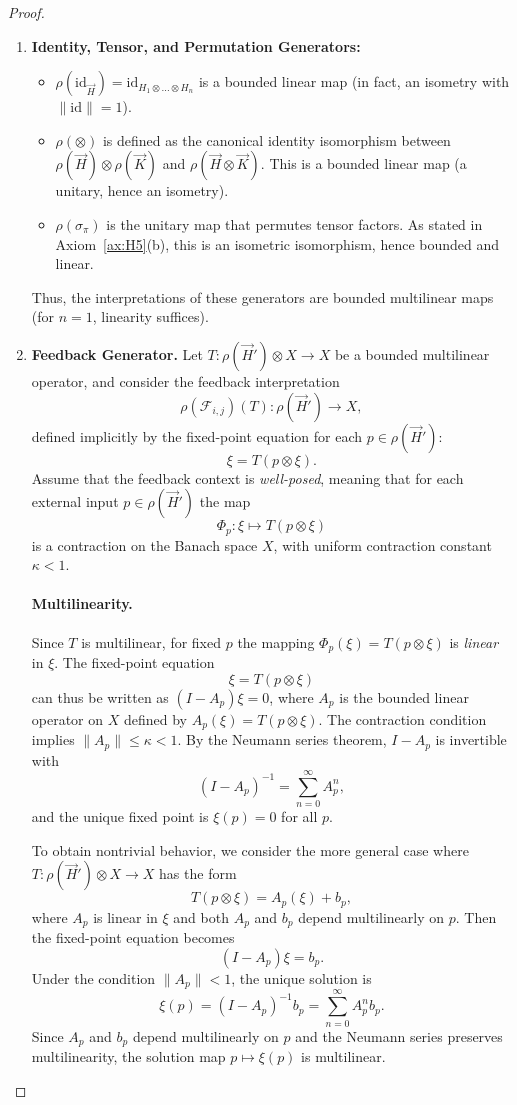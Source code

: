 \documentclass[11pt]{article}
\begin{document}
\begin{proof}
\begin{enumerate}[label=(\alph*)]
    \item \textbf{Identity, Tensor, and Permutation Generators:}
    \begin{itemize}
        \item $\rho(\mathrm{id}_{\vec{H}}) = \mathrm{id}_{H_1 \otimes \dots \otimes H_n}$ is a bounded linear map (in fact, an isometry with $\| \mathrm{id} \| = 1$).
        \item $\rho(\otimes)$ is defined as the canonical identity isomorphism between $\rho(\vec{H}) \otimes \rho(\vec{K})$ and $\rho(\vec{H} \otimes \vec{K})$. This is a bounded linear map (a unitary, hence an isometry).
        \item $\rho(\sigma_{\pi})$ is the unitary map that permutes tensor factors. As stated in Axiom~\ref{ax:H5}(b), this is an isometric isomorphism, hence bounded and linear.
    \end{itemize}
    Thus, the interpretations of these generators are bounded multilinear maps (for $n=1$, linearity suffices).

\item \textbf{Feedback Generator.} 
Let $T: \rho(\vec{H}') \otimes X \to X$ be a bounded multilinear operator, and consider the feedback interpretation 
\[
\rho(\mathcal{F}_{i,j})(T): \rho(\vec{H}') \to X,
\]
defined implicitly by the fixed-point equation for each $p \in \rho(\vec{H}')$:
\[
\xi = T(p \otimes \xi).
\]
Assume that the feedback context is \emph{well-posed}, meaning that for each external input $p \in \rho(\vec{H}')$ the map 
\[
\Phi_p : \xi \mapsto T(p \otimes \xi)
\]
is a contraction on the Banach space $X$, with uniform contraction constant $\kappa < 1$. 

\paragraph{Multilinearity.}
Since $T$ is multilinear, for fixed $p$ the mapping $\Phi_p(\xi) = T(p \otimes \xi)$ is \emph{linear} in $\xi$. The fixed-point equation
\[
\xi = T(p \otimes \xi)
\]
can thus be written as $(I - A_p)\xi = 0$, where $A_p$ is the bounded linear operator on $X$ defined by $A_p(\xi) = T(p \otimes \xi)$. 
The contraction condition implies $\|A_p\| \le \kappa < 1$. By the Neumann series theorem, $I - A_p$ is invertible with
\[
(I - A_p)^{-1} = \sum_{n=0}^\infty A_p^n,
\]
and the unique fixed point is $\xi(p) = 0$ for all $p$. 

To obtain nontrivial behavior, we consider the more general case where $T: \rho(\vec{H}') \otimes X \to X$ has the form
\[
T(p \otimes \xi) = A_p(\xi) + b_p,
\]
where $A_p$ is linear in $\xi$ and both $A_p$ and $b_p$ depend multilinearly on $p$. Then the fixed-point equation becomes
\[
(I - A_p)\xi = b_p.
\]
Under the condition $\|A_p\| < 1$, the unique solution is
\[
\xi(p) = (I - A_p)^{-1} b_p = \sum_{n=0}^\infty A_p^n b_p.
\]
Since $A_p$ and $b_p$ depend multilinearly on $p$ and the Neumann series preserves multilinearity, the solution map $p \mapsto \xi(p)$ is multilinear.


\end{enumerate}
\end{proof}
\end{document}

